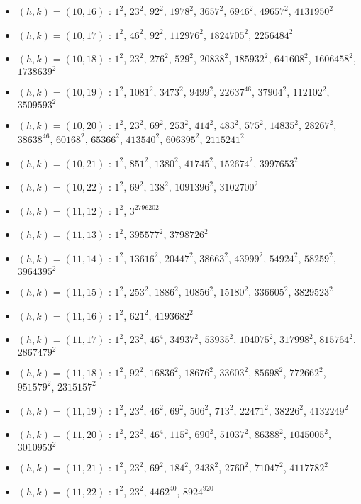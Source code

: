\begin{itemize}
\item $(h,k)=(10,16)$ : $1^{2}$, $23^{2}$, $92^{2}$, $1978^{2}$, $3657^{2}$, $6946^{2}$, $49657^{2}$, $4131950^{2}$
\item $(h,k)=(10,17)$ : $1^{2}$, $46^{2}$, $92^{2}$, $112976^{2}$, $1824705^{2}$, $2256484^{2}$
\item $(h,k)=(10,18)$ : $1^{2}$, $23^{2}$, $276^{2}$, $529^{2}$, $20838^{2}$, $185932^{2}$, $641608^{2}$, $1606458^{2}$, $1738639^{2}$
\item $(h,k)=(10,19)$ : $1^{2}$, $1081^{2}$, $3473^{2}$, $9499^{2}$, $22637^{46}$, $37904^{2}$, $112102^{2}$, $3509593^{2}$
\item $(h,k)=(10,20)$ : $1^{2}$, $23^{2}$, $69^{2}$, $253^{2}$, $414^{2}$, $483^{2}$, $575^{2}$, $14835^{2}$, $28267^{2}$, $38638^{46}$, $60168^{2}$, $65366^{2}$, $413540^{2}$, $606395^{2}$, $2115241^{2}$
\item $(h,k)=(10,21)$ : $1^{2}$, $851^{2}$, $1380^{2}$, $41745^{2}$, $152674^{2}$, $3997653^{2}$
\item $(h,k)=(10,22)$ : $1^{2}$, $69^{2}$, $138^{2}$, $1091396^{2}$, $3102700^{2}$
\item $(h,k)=(11,12)$ : $1^{2}$, $3^{2796202}$
\item $(h,k)=(11,13)$ : $1^{2}$, $395577^{2}$, $3798726^{2}$
\item $(h,k)=(11,14)$ : $1^{2}$, $13616^{2}$, $20447^{2}$, $38663^{2}$, $43999^{2}$, $54924^{2}$, $58259^{2}$, $3964395^{2}$
\item $(h,k)=(11,15)$ : $1^{2}$, $253^{2}$, $1886^{2}$, $10856^{2}$, $15180^{2}$, $336605^{2}$, $3829523^{2}$
\item $(h,k)=(11,16)$ : $1^{2}$, $621^{2}$, $4193682^{2}$
\item $(h,k)=(11,17)$ : $1^{2}$, $23^{2}$, $46^{4}$, $34937^{2}$, $53935^{2}$, $104075^{2}$, $317998^{2}$, $815764^{2}$, $2867479^{2}$
\item $(h,k)=(11,18)$ : $1^{2}$, $92^{2}$, $16836^{2}$, $18676^{2}$, $33603^{2}$, $85698^{2}$, $772662^{2}$, $951579^{2}$, $2315157^{2}$
\item $(h,k)=(11,19)$ : $1^{2}$, $23^{2}$, $46^{2}$, $69^{2}$, $506^{2}$, $713^{2}$, $22471^{2}$, $38226^{2}$, $4132249^{2}$
\item $(h,k)=(11,20)$ : $1^{2}$, $23^{2}$, $46^{4}$, $115^{2}$, $690^{2}$, $51037^{2}$, $86388^{2}$, $1045005^{2}$, $3010953^{2}$
\item $(h,k)=(11,21)$ : $1^{2}$, $23^{2}$, $69^{2}$, $184^{2}$, $2438^{2}$, $2760^{2}$, $71047^{2}$, $4117782^{2}$
\item $(h,k)=(11,22)$ : $1^{2}$, $23^{2}$, $4462^{40}$, $8924^{920}$

\end{itemize}
